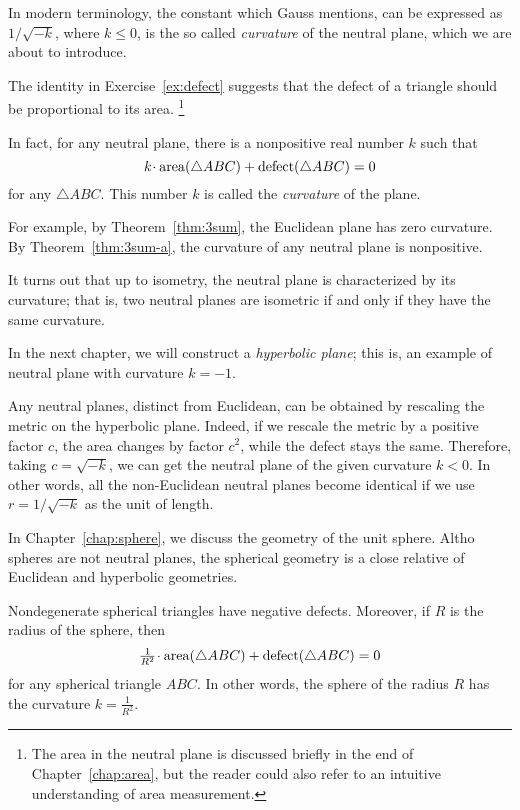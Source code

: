 In modern terminology, the constant which Gauss mentions, 
can be expressed as $1/\sqrt{-k}$, 
where $k\le 0$, is the so called \emph{curvature} of the neutral plane, which we are about to introduce.

The identity in Exercise~\ref{ex:defect} suggests that the defect of a triangle should be proportional to its area.%
\footnote{The area in the neutral plane is discussed briefly in the end of Chapter~\ref{chap:area},
but the reader could also refer to an intuitive understanding of area measurement.}

In fact, for any neutral plane, there is a nonpositive real number $k$
such that 
$$k\cdot\area(\triangle ABC)+\defect(\triangle ABC)=0$$
for any $\triangle ABC$.
This number $k$ is called the \emph{curvature} of the plane.

For example, by Theorem~\ref{thm:3sum}, the Euclidean plane has zero curvature.
By Theorem~\ref{thm:3sum-a}, the curvature of any neutral plane is nonpositive.

It turns out that up to isometry, the neutral plane is characterized by its curvature;
that is, two neutral planes are isometric if and only if they have the same curvature. 

In the next chapter, we will construct a {}\emph{hyperbolic plane};
this is, an example of neutral plane with curvature $k=-1$.

Any neutral planes, distinct from Euclidean,
can be obtained by rescaling the metric on the hyperbolic plane.
Indeed,
if we rescale the metric by a positive factor $c$,
the area changes by factor $c^2$, while the defect stays the same.
Therefore, taking $c=\sqrt{-k}$,
we can get the neutral plane of the given curvature $k<0$.
In other words, all the non-Euclidean neutral planes become identical
if we use $r=1/\sqrt{-k}$ as the unit of length.

\medskip

In Chapter~\ref{chap:sphere},
we discuss the geometry of the unit sphere.
Altho spheres are not neutral planes,
the spherical geometry is a close relative of Euclidean and hyperbolic geometries.

Nondegenerate spherical triangles have negative defects.
Moreover, 
if $R$ is the radius of the sphere, then
$$\tfrac1{R^2}\cdot\area(\triangle ABC)+\defect(\triangle ABC)=0$$
for any spherical triangle $ABC$.
In other words, 
the sphere of the radius $R$ has the curvature $k=\tfrac1{R^2}$.


